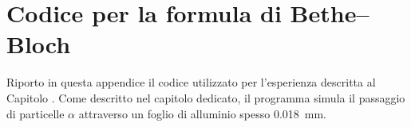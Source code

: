\chapter{Codice per la formula di Bethe--Bloch}\label{app:bet}
    Riporto in questa appendice il codice utilizzato per l'esperienza descritta al Capitolo . Come descritto nel capitolo dedicato, il programma simula il passaggio di particelle $\alpha$ attraverso un foglio di alluminio spesso \SI{0.018}{\milli\meter}.
    